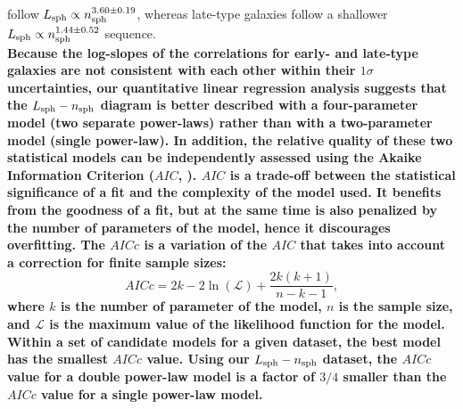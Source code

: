 \documentclass[preprint2]{emulateapj}
\begin{document}
follow $L_{\rm sph} \propto n_{\rm sph}^{3.60 \pm 0.19}$, 
whereas late-type galaxies follow a shallower $L_{\rm sph} \propto n_{\rm sph}^{1.44 \pm 0.52}$ sequence. \\
{\bf Because the log-slopes of the correlations for early- and late-type galaxies are not consistent with each other 
within their $1\sigma$ uncertainties, 
our quantitative linear regression analysis suggests that 
the $L_{\rm sph} - n_{\rm sph}$ diagram is better described with a four-parameter model 
(two separate power-laws) 
rather than with a two-parameter model (single power-law). 
In addition, the relative quality of these two statistical models can be independently assessed 
using the Akaike Information Criterion ($AIC$, \citealt{akaike1974}). 
$AIC$ is a trade-off between the statistical significance of a fit and the complexity of the model used. 
It benefits from the goodness of a fit, 
but at the same time is also penalized by the number of parameters of the model, 
hence it discourages overfitting. 
The $AICc$ is a variation of the $AIC$ that takes into account a correction for finite sample sizes: 
\begin{equation}
AICc = 2k - 2 \ln(\mathcal{L}) + \frac{2k (k+1)}{n-k-1} ,
\end{equation}
where $k$ is the number of parameter of the model, 
$n$ is the sample size, 
and $\mathcal{L}$ is the maximum value of the likelihood function for the model. 
Within a set of candidate models for a given dataset, 
the best model has the smallest $AICc$ value. 
Using our $L_{\rm sph} - n_{\rm sph}$ dataset, 
the $AICc$ value for a double power-law model is a factor of $3/4$ smaller 
than the $AICc$ value for a single power-law model. }
\end{document}
